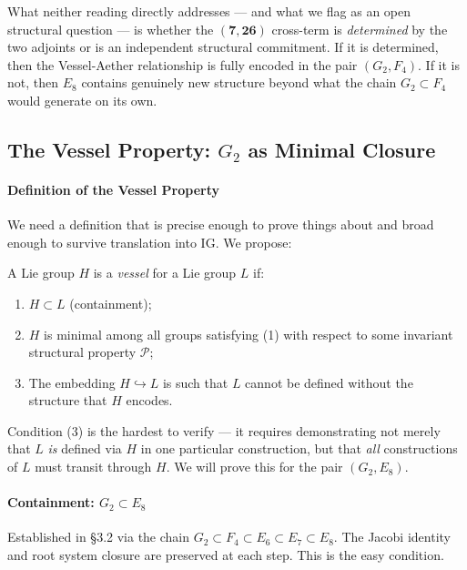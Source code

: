 \documentclass[12pt,a4paper]{article}
\newcommand{\pilcrow}{\S}
\begin{document}
What neither reading directly addresses --- and what we flag as an open structural question --- is whether the $(\mathbf{7}, \mathbf{26})$ cross-term is \emph{determined} by the two adjoints or is an independent structural commitment. If it is determined, then the Vessel-Aether relationship is fully encoded in the pair $(G_2, F_4)$. If it is not, then $E_8$ contains genuinely new structure beyond what the chain $G_2 \subset F_4$ would generate on its own.

\subsection{The Vessel Property: $G_2$ as Minimal Closure}

\paragraph{Definition of the Vessel Property}

We need a definition that is precise enough to prove things about and broad enough to survive translation into IG. We propose:

A Lie group $H$ is a \emph{vessel} for a Lie group $L$ if:

\begin{enumerate}
    \item $H \subset L$ (containment);
    \item $H$ is minimal among all groups satisfying (1) with respect to some invariant structural property $\mathcal{P}$;
    \item The embedding $H \hookrightarrow L$ is such that $L$ cannot be defined without the structure that $H$ encodes.
\end{enumerate}

Condition (3) is the hardest to verify --- it requires demonstrating not merely that $L$ \emph{is} defined via $H$ in one particular construction, but that \emph{all} constructions of $L$ must transit through $H$. We will prove this for the pair $(G_2, E_8)$.

\paragraph{Containment: $G_2 \subset E_8$}

Established in \pilcrow{}3.2 via the chain $G_2 \subset F_4 \subset E_6 \subset E_7 \subset E_8$. The Jacobi identity and root system closure are preserved at each step. This is the easy condition.
\end{document}

